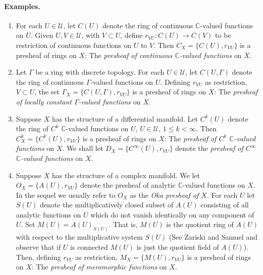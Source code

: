 \paragraph{Examples.}
\begin{enumerate}
\item For each $U\in\mathcal U$, let $C(U)$ denote the ring of continuous $\mathbb C$-valued functions on $U$. Given $U,V\in\mathcal U$, with $V\subset U$, define $r_{VU}:C(U)\to C(V)$ to be restriction of continuous functions on $U$ to $V$. Then $C_X=\{C(U),r_{VU}\}$ is a presheaf of rings on $X$: The \emph{presheaf of continuous $\mathbb C$-valued functions} on $X$.
\item Let $\Gamma$ be a ring with discrete topology. For each $U\in\mathcal U$, let $C(U,\Gamma)$ denote the ring of continuous $\Gamma$-valued functions on $U$. Defining $r_{VU}$ as restriction, $V\subset U$, the set $\Gamma_X=\{C(U,\Gamma),r_{VU}\}$ is a presheaf of rings on $X$: The \emph{presheaf of locally constant $\Gamma$-valued functions} on $X$.
\item Suppose $X$ has the structure of a differential manifold. Let $C^k(U)$ denote the ring of $C^k$ $\mathbb C$-valued functions on $U$, $U\in\mathcal U$, $1\leq k<\infty$. Then $C_X^k=\{C^k(U),r_{VU}\}$ is a presheaf of rings on $X$: The \emph{presheaf of $C^k$ $\mathbb C$-valued functions} on $X$. We shall let $D_X=\{C^\infty(U),r_{VU}\}$ denote the \emph{presheaf of $C^\infty$ $\mathbb C$-valued functions} on $X$.
\item Suppose $X$ has the structure of a complex manifold. We let $O_X=\{A(U),r_{VU}\}$ denote the presheaf of analytic $\mathbb C$-valued functions on $X$. In the sequel we usually refer to $O_X$ as the \emph{Oka presheaf of $X$}. For each $U$ let $S(U)$ denote the multiplicatively closed subset of $A(U)$ consisting of all analytic functions on $U$ which do not vanish identically on any component of $U$. Set $M(U)=A(U)_{S(U)}$. That is, $M(U)$ is the quotient ring of $A(U)$ with respect to the multiplicative system $S(U)$ (See Zariski and Samuel \cite[page 46]{bib:II:zariski-o-and-samuel-p:1} and observe that if $U$ is connected $M(U)$ is just the quotient field of $A(U)$). Then, defining $r_{VU}$ as restriction, $M_X=\{M(U),r_{VU}\}$ is a presheaf of rings on $X$: The \emph{presheaf of meromorphic functions} on $X$.

\end{enumerate}

